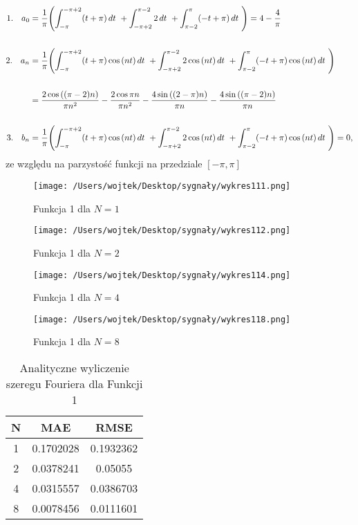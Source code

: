\documentclass[leqno,a4paper]{article}
\begin{document}
\begin{align*}
1.\hspace{0.34cm} a_0 &= \frac{1}{\pi}\Biggl(\int_{-\pi}^{-\pi+2}(t+\pi)\,dt\ + \int_{-\pi+2}^{\pi-2}2\,dt\ +\int_{\pi-2}^{\pi}(-t+\pi)\,dt\ \Biggr) = 4 - \frac{4}{\pi} 
\\\\
2.\hspace{0.34cm} a_n &= \frac{1}{\pi}\Biggl(\int_{-\pi}^{-\pi+2}(t+\pi)\cos{(nt)}\,dt\ + \int_{-\pi+2}^{\pi-2}2\cos{(nt)}\,dt\ +\int_{\pi-2}^{\pi}(-t+\pi)\cos{(nt)}\,dt\ \Biggr) \\\\
&= \frac{2\cos{((\pi-2)n)}}{\pi n^2}-\frac{2\cos{\pi n}}{\pi n^2} - \frac{4\sin{((2-\pi)n)}}{\pi n} - \frac{4\sin{((\pi-2)n)}}{\pi n}
\\\\
3.\hspace{0.34cm} b_n &= \frac{1}{\pi}\Biggl(\int_{-\pi}^{-\pi+2}(t+\pi)\cos{(nt)}\,dt\ + \int_{-\pi+2}^{\pi-2}2\cos{(nt)}\,dt\ +\int_{\pi-2}^{\pi}(-t+\pi)\cos{(nt)}\,dt\ \Biggr) = 0,
\end{align*}
ze względu na parzystość funkcji na przedziale $[-\pi,\pi]$

\begin{figure}
  \texttt{[image: /Users/wojtek/Desktop/sygnały/wykres111.png]}
  \caption{Funkcja 1 dla $N=1$}
  \centering
\end{figure}

\begin{figure}
  \texttt{[image: /Users/wojtek/Desktop/sygnały/wykres112.png]}
  \centering
    \caption{Funkcja 1 dla $N=2$}
\end{figure}

\begin{figure}
  \texttt{[image: /Users/wojtek/Desktop/sygnały/wykres114.png]}
  \centering
   \caption{Funkcja 1 dla $N=4$}
\end{figure}

\begin{figure}
  \texttt{[image: /Users/wojtek/Desktop/sygnały/wykres118.png]}
  \centering
  \caption{Funkcja 1 dla $N=8$}
\end{figure}

\begin{table}
\centering
\begin{tabular}{||c c c||} 
 \hline
 N & MAE & RMSE \\ 
 \hline\hline
 1 & 0.1702028 & 0.1932362\\ 
 2 & 0.0378241 & 0.05055 \\
 4 & 0.0315557 & 0.0386703 \\
 8 & 0.0078456 & 0.0111601 \\
 \hline\hline
\end{tabular}
\caption{Analityczne wyliczenie szeregu Fouriera dla Funkcji 1}
\end{table} 
\end{document}
